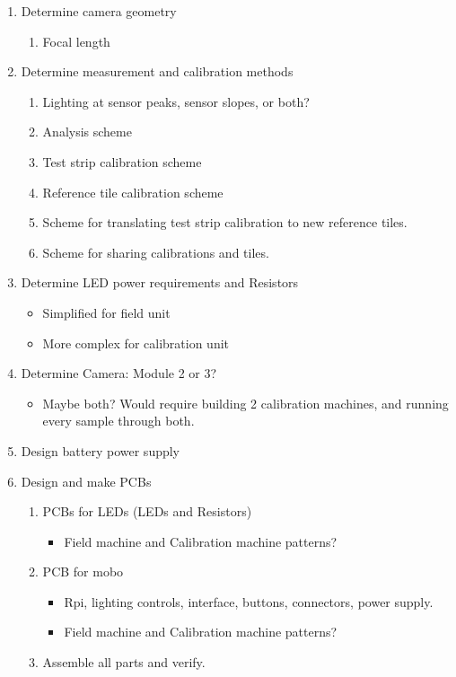 \documentclass{article}
\begin{document}
\begin{enumerate}[label=\arabic*.]
\item Determine camera geometry
\begin{enumerate}[label=\alph*)]
    \item Focal length
\end{enumerate}

\item Determine measurement and calibration methods
\begin{enumerate}[label=\alph*)]
    \item Lighting at sensor peaks, sensor slopes, or both?
    \item Analysis scheme
    \item Test strip calibration scheme
    \item Reference tile calibration scheme
    \item Scheme for translating test strip calibration to new reference tiles.
    \item Scheme for sharing calibrations and tiles.
\end{enumerate}

\item Determine LED power requirements and Resistors
\begin{itemize}
    \item Simplified for field unit
    \item More complex for calibration unit
\end{itemize}

\item Determine Camera: Module 2 or 3?
\begin{itemize}
    \item Maybe both? Would require building 2 calibration machines, and running every sample through both.
\end{itemize}

\item Design battery power supply

\item Design and make PCBs
\begin{enumerate}[label=\alph*)]
    \item PCBs for LEDs (LEDs and Resistors)
    \begin{itemize}
        \item Field machine and Calibration machine patterns?
    \end{itemize}
    \item PCB for mobo
    \begin{itemize}
        \item Rpi, lighting controls, interface, buttons, connectors, power supply.
        \item Field machine and Calibration machine patterns?
    \end{itemize}
    \item Assemble all parts and verify.
\end{enumerate}


\end{enumerate}
\end{document}
